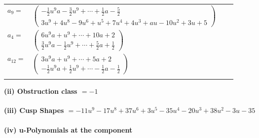 \documentclass[1p]{elsarticle_modified}
\theoremstyle{definition}
\begin{document}
\begin{tabular}{m{7pt} m{180pt} m{7pt} m{180pt} }
\flushright $a_{9}=$&$\begin{pmatrix}-\frac{1}{2} u^9 a-\frac{3}{2} u^9+\cdots+\frac{1}{2} a-\frac{5}{2}\\3 u^9+4 u^8-9 u^6+u^5+7 u^4+4 u^3+a u-10 u^2+3 u+5\end{pmatrix}$ \\
\flushright $a_{4}=$&$\begin{pmatrix}6 u^9 a+u^9+\cdots+10 a+2\\\frac{3}{2} u^9 a-\frac{1}{2} u^9+\cdots+\frac{5}{2} a+\frac{1}{2}\end{pmatrix}$ \\
\flushright $a_{12}=$&$\begin{pmatrix}3 u^9 a+u^9+\cdots+5 a+2\\-\frac{1}{2} u^9 a+\frac{1}{2} u^9+\cdots-\frac{1}{2} a-\frac{1}{2}\end{pmatrix}$\\&\end{tabular}
\flushleft \textbf{(ii) Obstruction class $= -1$}\\~\\
\flushleft \textbf{(iii) Cusp Shapes $= -11 u^9-17 u^8+37 u^6+3 u^5-35 u^4-20 u^3+38 u^2-3 u-35$}\\~\\
\newpage\renewcommand{\arraystretch}{1}
\flushleft \textbf{(iv) u-Polynomials at the component}\newline \\
\end{document}
